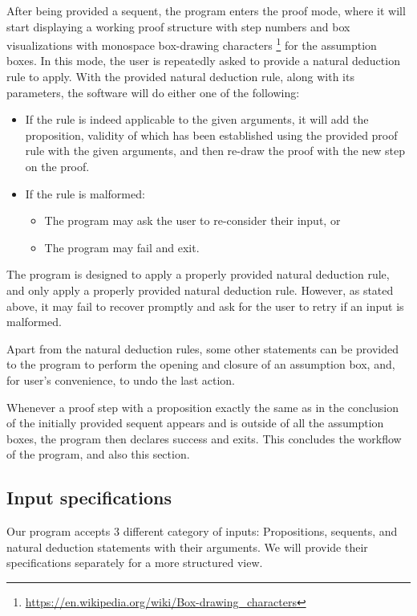 \documentclass{article}
\begin{document}
After being provided a sequent, the program enters the proof mode,
where it will start displaying a working proof structure with step
numbers and box visualizations with monospace box-drawing characters%
\footnote{\url{https://en.wikipedia.org/wiki/Box-drawing\_characters}}
for the assumption boxes. In this mode, the user is repeatedly asked to
provide a natural deduction rule to apply. With the provided
natural deduction rule, along with its parameters, the software
will do either one of the following:
\begin{itemize}
	\item If the rule is indeed applicable to the given arguments, it will
		add the proposition, validity of which has been established
		using the provided proof rule with the given arguments, and
		then re-draw the proof with the new step on the proof.
	\item If the rule is malformed:
		\begin{itemize}
			\item The program may ask the user to re-consider their
				input, or
			\item The program may fail and exit.
		\end{itemize}
\end{itemize}

The program is designed to apply a properly provided natural
deduction rule, and only apply a properly provided natural deduction
rule. However, as stated above, it may fail to recover promptly
and ask for the user to retry if an input is malformed.

Apart from the natural deduction rules, some other statements can be
provided to the program to perform the opening and closure of an assumption
box, and, for user's convenience, to undo the last action.

Whenever a proof step with a proposition exactly the same as in the
conclusion of the initially provided sequent appears and is outside of all
the assumption boxes, the program then declares success and
exits. This concludes the workflow of the program, and also this
section.

\subsection{Input specifications}

Our program accepts 3 different category of inputs:
Propositions, sequents, and natural deduction statements
with their arguments. We will provide their specifications
separately for a more structured view.
\end{document}
